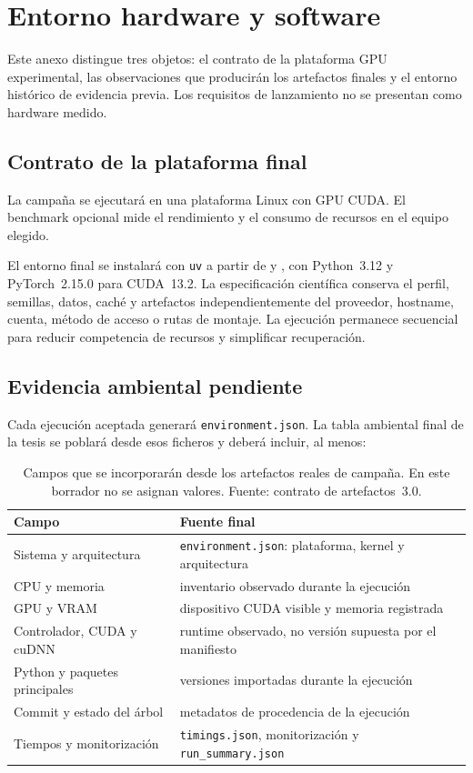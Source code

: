 \chapter{Entorno hardware y software}
\label{cap:anexo-entorno}

Este anexo distingue tres objetos: el contrato de la plataforma GPU experimental, las observaciones que producirán los artefactos finales y el entorno histórico de evidencia previa. Los requisitos de lanzamiento no se presentan como hardware medido.

\section{Contrato de la plataforma final}

La campaña se ejecutará en una plataforma Linux con GPU CUDA. El benchmark opcional mide el rendimiento y el consumo de recursos en el equipo elegido.

El entorno final se instalará con \texttt{uv} a partir de  y , con Python~3.12 y PyTorch~2.15.0 para CUDA~13.2. La especificación científica conserva el perfil, semillas, datos, caché y artefactos independientemente del proveedor, hostname, cuenta, método de acceso o rutas de montaje. La ejecución permanece secuencial para reducir competencia de recursos y simplificar recuperación.

\section{Evidencia ambiental pendiente}

Cada ejecución aceptada generará \texttt{environment.json}. La tabla ambiental final de la tesis se poblará desde esos ficheros y deberá incluir, al menos:

\begin{table}[htbp]
\centering
\small
\begin{tabular}{p{4.2cm}p{7.8cm}}
\toprule
Campo & Fuente final \\
\midrule
Sistema y arquitectura & \texttt{environment.json}: plataforma, kernel y arquitectura \\
CPU y memoria & inventario observado durante la ejecución \\
GPU y VRAM & dispositivo CUDA visible y memoria registrada \\
Controlador, CUDA y cuDNN & runtime observado, no versión supuesta por el manifiesto \\
Python y paquetes principales & versiones importadas durante la ejecución \\
Commit y estado del árbol & metadatos de procedencia de la ejecución \\
Tiempos y monitorización & \texttt{timings.json}, monitorización y \texttt{run\_summary.json} \\
\bottomrule
\end{tabular}
\caption[Procedencia del entorno experimental final]{Campos que se incorporarán desde los artefactos reales de campaña. En este borrador no se asignan valores. Fuente: contrato de artefactos~3.0.}
\label{tab:entorno-final-pendiente}
\end{table}

